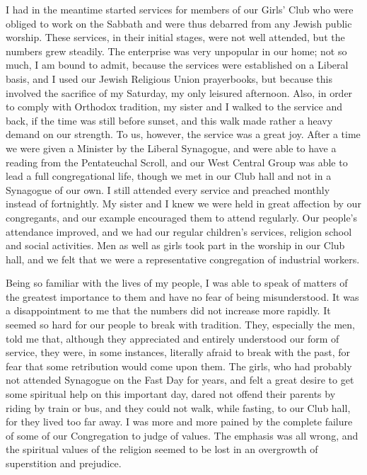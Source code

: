 I had in the meantime started services for members
of our Girls’ Club who were obliged to work on the
Sabbath and were thus debarred from any Jewish public
worship. These services, in their initial stages, were
not well attended, but the numbers grew steadily. The
enterprise was very unpopular in our home; not so much,
I am bound to admit, because the services were established
on a Liberal basis, and I used our Jewish Religious
Union prayerbooks, but because this involved the
sacrifice of my Saturday, my only leisured afternoon.
Also, in order to comply with Orthodox tradition, my
sister and I walked to the service and back, if the time
was still before sunset, and this walk made rather a
heavy demand on our strength. To us, however, the
service was a great joy. After a time we were given a
Minister by the Liberal Synagogue, and were able to
have a reading from the Pentateuchal Scroll, and our
West Central Group was able to lead a full congregational
life, though we met in our Club hall and not in a Synagogue
of our own. I still attended every service and
preached monthly instead of fortnightly. My sister and
I knew we were held in great affection by our congregants,
and our example encouraged them to attend regularly.
Our people’s attendance improved, and we had our
regular children’s services, religion school and social
activities. Men as well as girls took part in the worship
in our Club hall, and we felt that we were a representative
congregation of industrial workers.

Being so familiar with the lives of my people,
I was able to speak of matters of the greatest
importance to them and have no fear of being misunderstood.
It was a disappointment to me that the numbers
did not increase more rapidly. It seemed so hard for
our people to break with tradition. They, especially
the men, told me that, although they appreciated and
entirely understood our form of service, they were, in
some instances, literally afraid to break with the past,
for fear that some retribution would come upon them.
The girls, who had probably not attended Synagogue on
the Fast Day for years, and felt a great desire to get
some spiritual help on this important day, dared not
offend their parents by riding by train or bus, and they
could not walk, while fasting, to our Club hall, for they
lived too far away. I was more and more pained by the
complete failure of some of our Congregation to judge of
values. The emphasis was all wrong, and the spiritual
values of the religion seemed to be lost in an overgrowth
of superstition and prejudice.

